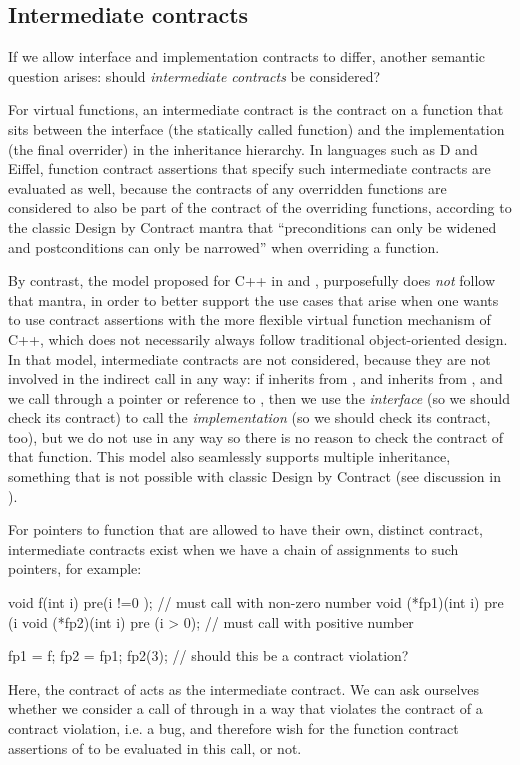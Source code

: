 \subsection{Intermediate contracts}
\label{subsec:intermed}

If we allow interface and implementation contracts to differ, another semantic question arises: should \emph{intermediate contracts} be considered?

For virtual functions, an intermediate contract is the contract on a function that sits between the interface (the statically called function) and the implementation (the final overrider) in the inheritance hierarchy. In languages such as D and Eiffel, function contract assertions that specify such intermediate contracts are evaluated as well, because the contracts of any overridden functions are considered to also be part of the contract of the overriding functions, according to the classic Design by Contract mantra that ``preconditions can only be widened and postconditions can only be narrowed'' when overriding a function.

By contrast, the model proposed for C++ in \cite{P3097R0} and \cite{P3165R0}, purposefully does \emph{not} follow that mantra, in order to better support the  use cases that arise when one wants to use contract assertions with the more flexible virtual function mechanism of C++, which does not necessarily always follow traditional object-oriented design. In that model, intermediate contracts are not considered, because they are not involved in the indirect call in any way: if  inherits from , and  inherits from , and we call  through a pointer or reference to , then we use the \emph{interface}  (so we should check its contract) to call the \emph{implementation}  (so we should check its contract, too), but we do not use  in any way so there is no reason to check the contract of that function. This model also seamlessly supports multiple inheritance, something that is not possible with classic Design by Contract (see discussion in \cite{P3097R0}).

For pointers to function that are allowed to have their own, distinct contract, intermediate contracts exist when we have a chain of assignments to such pointers, for example:
\begin{codeblock}
	
void f(int i) pre(i !=0 );             // must call with non-zero number
void (*fp1)(int i) pre (i %
void (*fp2)(int i) pre (i > 0);        // must call with positive number

fp1 = f;
fp2 = fp1;
fp2(3);   // should this be a contract violation?
\end{codeblock}
Here, the contract of  acts as the intermediate contract. We can ask ourselves whether we consider a call of  through  in a way that violates the contract of  a contract violation, i.e. a bug, and therefore wish for the function contract assertions of  to be evaluated in this call, or not. 

